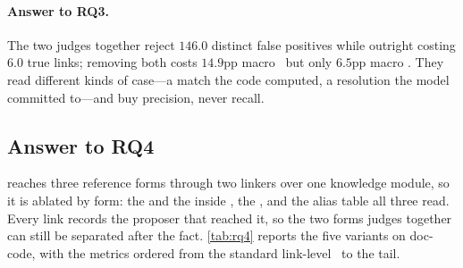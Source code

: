 \begin{rqanswer}
\paragraph{Answer to RQ3.}
The two judges together reject $146.0$ distinct false positives while outright costing $6.0$ true links; removing both costs $14.9$pp macro \fone\ but only $6.5$pp macro \ftwo.
They read different kinds of case---a match the code computed, a resolution the model committed to---and buy precision, never recall.
\end{rqanswer}

\subsection{Answer to RQ4}
\label{sec:results:rq4}


\approach{} reaches three reference forms through two linkers over one knowledge module, so it is ablated by form: the \linkerB{} and the \linkerD{} inside \linkerN{}, the \linkerC{}, and the alias table all three read.
Every link records the proposer that reached it, so the two forms \linkerN{} judges together can still be separated after the fact.
\autoref{tab:rq4} reports the five variants on doc-code, with the metrics ordered from the standard link-level \fone\ to the tail.

